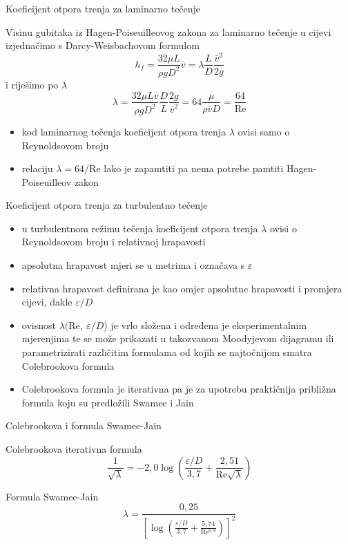 \documentclass[croatian]{beamer}
\begin{document}
\begin{frame}{Koeficijent otpora trenja za laminarno tečenje}

Visinu gubitaka iz Hagen-Poiseuilleovog zakona za laminarno tečenje
u cijevi izjednačimo s Darcy-Weisbachovom formulom
\[
h_{f}=\frac{32\mu L}{\rho gD^{2}}\bar{v}=\lambda\frac{L}{D}\frac{\bar{v}^{2}}{2g}
\]
i riješimo po $\lambda$
\[
\lambda=\frac{32\mu L\bar{v}}{\rho gD^{2}}\frac{D}{L}\frac{2g}{\bar{v}^{2}}=64\frac{\mu}{\rho\bar{v}D}=\frac{64}{\mathrm{Re}}
\]

\begin{block}{}

\begin{itemize}
\item kod laminarnog tečenja koeficijent otpora trenja $\lambda$ ovisi
samo o Reynoldsovom broju
\item relaciju $\lambda=64/\mathrm{Re}$ lako je zapamtiti pa nema potrebe
pamtiti Hagen-Poiseuilleov zakon
\end{itemize}
\end{block}
\end{frame}

\begin{frame}{Koeficijent otpora trenja za turbulentno tečenje}

\begin{itemize}
\item u turbulentnom režimu tečenja koeficijent otpora trenja $\lambda$
ovisi o Reynoldsovom broju i \alert{relativnoj hrapavosti}
\item \alert{apsolutna hrapavost} mjeri se u metrima i označava s $\varepsilon$
\item \alert{relativna hrapavost} definirana je kao omjer apsolutne hrapavosti
i promjera cijevi, dakle $\varepsilon/D$
\item ovisnost $\lambda(\mathrm{Re},\:\varepsilon/D$) je vrlo složena i
određena je eksperimentalnim mjerenjima te se može prikazati u takozvanom
Moodyjevom dijagramu ili parametrizirati različitim formulama od kojih
se najtočnijom smatra Colebrookova formula
\item Colebrookova formula je iterativna pa je za upotrebu praktičnija približna
formula koju su predložili Swamee i Jain
\end{itemize}
\end{frame}

\begin{frame}{Colebrookova i formula Swamee-Jain}

Colebrookova iterativna formula
\[
\frac{1}{\sqrt{\lambda}}=-2,0\log\left(\frac{\varepsilon/D}{3,7}+\frac{2,51}{\mathrm{Re}\sqrt{\lambda}}\right)
\]

\vfill{}

Formula Swamee-Jain
\[
\lambda=\frac{0,25}{\left[\log\left(\frac{\varepsilon/D}{3,7}+\frac{5,74}{\mathrm{Re^{0,9}}}\right)\right]^{2}}
\]

\end{frame}
\end{document}
